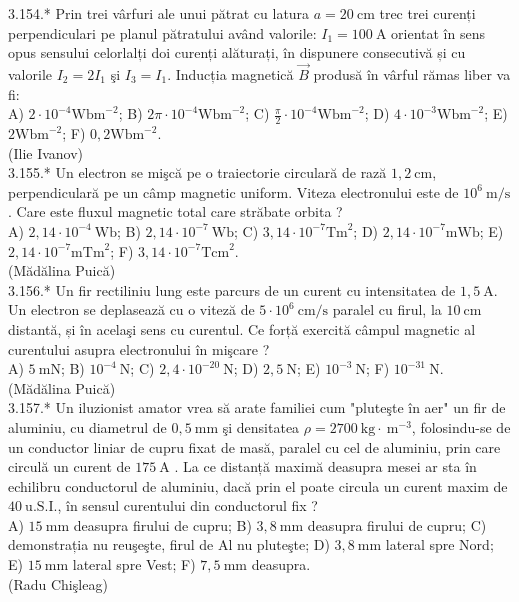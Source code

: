 \documentclass[10pt]{article}
\begin{document}
3.154.* Prin trei vârfuri ale unui pătrat cu latura $a=20 \mathrm{~cm}$ trec trei curenți perpendiculari pe planul pătratului având valorile: $I_{1}=100 \mathrm{~A}$ orientat în sens opus sensului celorlalți doi curenți alăturați, în dispunere consecutivă și cu valorile $I_{2}=2 I_{1}$ şi $I_{3}=I_{1}$. Inducția magnetică $\vec{B}$ produsă în vârful rămas liber va fi:\\ A) $2 \cdot 10^{-4} \mathrm{Wbm}^{-2}$; B) $2 \pi \cdot 10^{-4} \mathrm{Wbm}^{-2}$; C) $\frac{\pi}{2} \cdot 10^{-4} \mathrm{Wbm}^{-2}$; D) $4 \cdot 10^{-3} \mathrm{Wbm}^{-2}$; E) $2 \mathrm{Wbm}^{-2}$; F) $0,2 \mathrm{Wbm}^{-2}$.\\ (Ilie Ivanov)\\

3.155.* Un electron se mişcă pe o traiectorie circulară de rază $1,2 \mathrm{~cm}$, perpendiculară pe un câmp magnetic uniform. Viteza electronului este de $10^{6} \mathrm{~m} / \mathrm{s}$. Care este fluxul magnetic total care străbate orbita ?\\ A) $2,14 \cdot 10^{-4} \mathrm{~Wb}$; B) $2,14 \cdot 10^{-7} \mathrm{~Wb}$; C) $3,14 \cdot 10^{-7} \mathrm{Tm}^{2}$; D) $2,14 \cdot 10^{-7} \mathrm{mWb}$; E) $2,14 \cdot 10^{-7} \mathrm{mTm}^{2}$; F) $3,14 \cdot 10^{-7} \mathrm{Tcm}^{2}$.\\ (Mădălina Puică)\\

3.156.* Un fir rectiliniu lung este parcurs de un curent cu intensitatea de $1,5 \mathrm{~A}$. Un electron se deplasează cu o viteză de $5 \cdot 10^{6} \mathrm{~cm} / \mathrm{s}$ paralel cu firul, la $10 \mathrm{~cm}$ distantă, și în acelaşi sens cu curentul. Ce forță exercită câmpul magnetic al curentului asupra electronului în mişcare ?\\ A) $5 \mathrm{~mN}$; B) $10^{-4} \mathrm{~N}$; C) $2,4 \cdot 10^{-20} \mathrm{~N}$; D) $2,5 \mathrm{~N}$; E) $10^{-3} \mathrm{~N}$; F) $10^{-31} \mathrm{~N}$.\\ (Mădălina Puică)\\

3.157.* Un iluzionist amator vrea să arate familiei cum "pluteşte în aer" un fir de aluminiu, cu diametrul de $0,5 \mathrm{~mm}$ şi densitatea $\rho=2700 \mathrm{~kg} \cdot \mathrm{~m}^{-3}$, folosindu-se de un conductor liniar de cupru fixat de masă, paralel cu cel de aluminiu, prin care circulă un curent de $175 \mathrm{~A}$ . La ce distanță maximă deasupra mesei ar sta în echilibru conductorul de aluminiu, dacă prin el poate circula un curent maxim de $40 \mathrm{~u.S.I.}$, în sensul curentului din conductorul fix ?\\ A) $15 \mathrm{~mm}$ deasupra firului de cupru; B) $3,8 \mathrm{~mm}$ deasupra firului de cupru; C) demonstrația nu reuşeşte, firul de Al nu pluteşte; D) $3,8 \mathrm{~mm}$ lateral spre Nord; E) $15 \mathrm{~mm}$ lateral spre Vest; F) $7,5 \mathrm{~mm}$ deasupra.\\ (Radu Chişleag)\\
\end{document}
